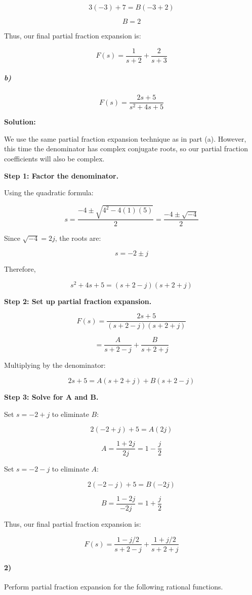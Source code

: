 \documentclass{article}
\begin{document}
\[
3(-3)+7=B(-3+2)
\]

\[
\boxed{B=2}
\]

Thus, our final partial fraction expansion is:

\[
\boxed{F(s)=\frac{1}{s+2}+\frac{2}{s+3}}
\]


\subparagraph{b)}
\[
F(s)=\frac{2s+5}{s^2+4s+5}
\]

\textbf{Solution:}

We use the same partial fraction expansion technique as in part (a). However, this time the denominator has complex conjugate roots, so our partial fraction coefficients will also be complex.

\textbf{Step 1: Factor the denominator.}

Using the quadratic formula:

\[
s=\frac{-4\pm\sqrt{4^2-4(1)(5)}}{2}
=\frac{-4\pm\sqrt{-4}}{2}
\]

Since $\sqrt{-4}=2j$, the roots are:

\[
\boxed{s=-2\pm j}
\]

Therefore,

\[
s^2+4s+5=(s+2-j)(s+2+j)
\]

\textbf{Step 2: Set up partial fraction expansion.}

\[
F(s)
=\frac{2s+5}{(s+2-j)(s+2+j)}
\]

\[
=\frac{A}{s+2-j}+\frac{B}{s+2+j}
\]

Multiplying by the denominator:

\[
2s+5=A(s+2+j)+B(s+2-j)
\]

\textbf{Step 3: Solve for A and B.}

Set $s=-2+j$ to eliminate $B$:

\[
2(-2+j)+5=A(2j)
\]

\[
A=\frac{1+2j}{2j}
=\boxed{1-\frac{j}{2}}
\]

Set $s=-2-j$ to eliminate $A$:

\[
2(-2-j)+5=B(-2j)
\]

\[
B=\frac{1-2j}{-2j}
=\boxed{1+\frac{j}{2}}
\]

Thus, our final partial fraction expansion is:

\[
\boxed{
F(s)=\frac{1-j/2}{s+2-j}
+\frac{1+j/2}{s+2+j}
}
\]


\newpage

\paragraph{2)} Perform partial fraction expansion for the following rational functions.
\end{document}
